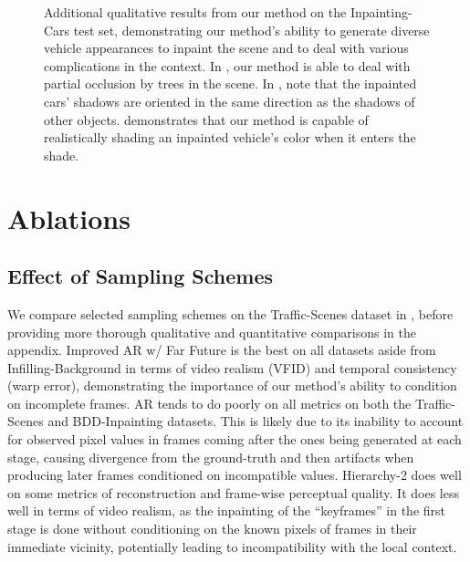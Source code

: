 \begin{figure}
\begin{subfigure}{\textwidth}
        \label{fig:extra-cars3}
    \end{subfigure}%
    \caption[Additional qualitative results from our method on the Inpainting-Cars
    test set.]{Additional qualitative results from our method on the Inpainting-Cars test set, demonstrating our method's ability to generate diverse vehicle appearances to inpaint the scene and to deal with various complications in the context.  In , our method is able to deal with partial occlusion by trees in the scene. In , note that the inpainted cars' shadows are oriented in the same direction as the shadows of other objects.  demonstrates that our method is capable of realistically shading an inpainted vehicle's color when it enters the shade.
    }
    \label{fig:extra-cars}
\end{figure}

\section{Ablations}

\subsection{Effect of Sampling Schemes}
We compare selected sampling schemes on the Traffic-Scenes dataset in , before providing more thorough qualitative and quantitative comparisons in the appendix. Improved AR w/ Far Future is the best on all datasets aside from Infilling-Background in terms of video realism (VFID) and temporal consistency (warp error), demonstrating the importance of our method's ability to condition on incomplete frames. AR tends to do poorly on all metrics on both the Traffic-Scenes and BDD-Inpainting datasets. This is likely due to its inability to account for observed pixel values in frames coming after the ones being generated at each stage, causing divergence from the ground-truth and then artifacts when producing later frames conditioned on incompatible values. Hierarchy-2 does well on some metrics of reconstruction and frame-wise perceptual quality. It does less well in terms of video realism, as the inpainting of the ``keyframes'' in the first stage is done without conditioning on the known pixels of frames in their immediate vicinity, potentially leading to incompatibility with the local context.

